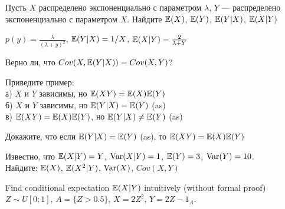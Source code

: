 \begin{problem}
Пусть $X$ распределено экспоненциально с параметром $\lambda$, $Y$ --- распределено экспоненциально с параметром $X$. Найдите $\mathbb{E}(X)$, $\mathbb{E}(Y)$, $\mathbb{E}(Y|X)$, $\mathbb{E}(X|Y)$ 
\end{problem} 
\begin{solution} 
 $p(y)=\frac{\lambda}{(\lambda+y)^{2}}$, $\mathbb{E}(Y|X)=1/X$, $\mathbb{E}(X|Y)=\frac{2}{\lambda+Y}$ 
\end{solution}

\begin{problem}
Верно ли, что $Cov(X,\mathbb{E}(Y|X))=Cov(X,Y)$? 
\end{problem} 
\begin{solution} 

\end{solution}

\begin{problem}
Приведите пример: \\
а) $X$ и $Y$ зависимы, но $\mathbb{E}(XY)=\mathbb{E}(X)\mathbb{E}(Y)$ \\
б) $X$ и $Y$ зависимы, но $\mathbb{E}(Y|X)=\mathbb{E}(Y)$ (as) \\
в) $\mathbb{E}(XY)=\mathbb{E}(X)\mathbb{E}(Y)$, но $\mathbb{E}(Y|X)\neq \mathbb{E}(Y)$ (as) 
\end{problem} 
\begin{solution} 

\end{solution}

\begin{problem}
Докажите, что если $\mathbb{E}(Y|X)=\mathbb{E}(Y)$ (as), то $\mathbb{E}(XY)=\mathbb{E}(X)\mathbb{E}(Y)$ 
\end{problem} 
\begin{solution} 

\end{solution}

\begin{problem}
Известно, что $\mathbb{E}(X|Y)=Y$, $\operatorname{Var}(X|Y)=1$, $\mathbb{E}(Y)=3$, $\operatorname{Var}(Y)=10$. \\
Найдите: $\mathbb{E}(X)$, $\mathbb{E}(X^{2}|Y)$, $\operatorname{Var}(X)$, $Cov(X,Y)$ 
\end{problem} 
\begin{solution} 

\end{solution}

\begin{problem}
Find conditional expectation $\mathbb{E}(X|Y)$ intuitively (without formal proof)  \\
$Z\sim U[0;1]$, $A=\{Z>0.5\}$, $X=2Z^{2}$, $Y=2Z-1_{A}$.
\end{problem} 
\begin{solution} 

\end{solution}

